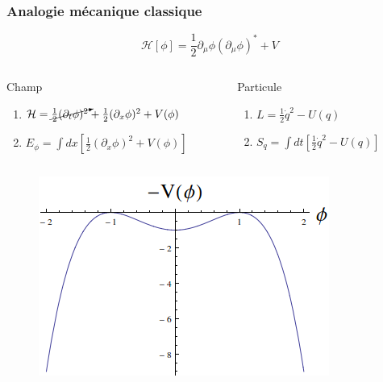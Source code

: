 \documentclass[handout]{beamer}
\begin{document}
\begin{frame} \frametitle{Analogie mécanique classique}
\begin{equation*}
\mathcal{H}[\phi] = \frac{1}{2} \partial_\mu \phi (\partial_\mu \phi)^* +V
\end{equation*}
\begin{columns}[T]
    \begin{column}[T]{.55\linewidth}
    Champ
    \begin{enumerate}
    \item $\mathcal{H} =  \cancelto{}{\frac{1}{2}  (\partial_t \phi)^2} +  \frac{1}{2}  (\partial_x \phi)^2 +V(\phi) $
    \item $E_\phi = \int{dx\left[\frac{1}{2}  (\partial_x \phi)^2 +V(\phi) \right]}$
    \end{enumerate}
    \end{column}
    \begin{column}[T]{.45\linewidth}
	Particule
    \begin{enumerate}
    \item $L =   \frac{1}{2}  \dot{q}^2 -U(q)$
    \item $S_q = \int{dt[\frac{1}{2}  \dot{q}^2 -U(q)] }$
    \end{enumerate}
    \end{column}
  \end{columns}
  \begin{figure}
\includegraphics[scale=0.5]{pot_inv.png}
\end{figure}
% 

  
\end{frame}
\end{document}

